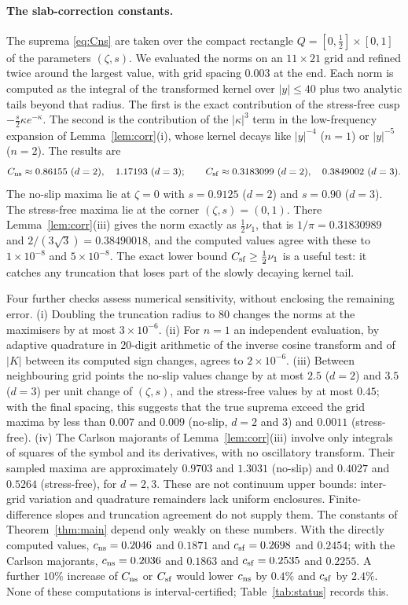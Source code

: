 \paragraph{The slab-correction constants.} The suprema \eqref{eq:Cns} are taken over the compact rectangle
$Q=[0,\frac12]\times[0,1]$ of the parameters $(\zeta,s)$. We evaluated the norms on an $11\times21$ grid and
refined twice around the largest value, with grid spacing $0.003$ at the end. Each norm is computed as the
integral of the transformed kernel over $|y|\le40$ plus two analytic tails beyond that radius. The first is the
exact contribution of the stress-free cusp $-\frac s2\kappa e^{-\kappa}$. The second is the contribution of the
$|\kappa|^3$ term in the low-frequency expansion of Lemma~\ref{lem:corr}(i), whose kernel decays like
$|y|^{-4}$ ($n=1$) or $|y|^{-5}$ ($n=2$). The results are
\[
C_{\rm ns}\approx0.86155\ (d=2),\quad 1.17193\ (d=3);\qquad C_{\rm sf}\approx0.3183099\ (d=2),\quad 0.3849002\ (d=3).
\]
The no-slip maxima lie at $\zeta=0$ with $s=0.9125$ ($d=2$) and $s=0.90$ ($d=3$). The stress-free maxima lie at
the corner $(\zeta,s)=(0,1)$. There Lemma~\ref{lem:corr}(iii) gives the norm exactly as $\frac12\nu_1$, that is
$1/\pi=0.31830989$ and $2/(3\sqrt3)=0.38490018$, and the computed values agree with these to $1\times10^{-8}$
and $5\times10^{-8}$. The exact lower bound $C_{\rm sf}\ge\frac12\nu_1$ is a useful test: it catches any
truncation that loses part of the slowly decaying kernel tail.

Four further checks assess numerical sensitivity, without enclosing the remaining error. (i) Doubling the truncation radius to $80$ changes the norms at
the maximisers by at most $3\times10^{-6}$. (ii) For $n=1$ an independent evaluation, by adaptive quadrature in
$20$-digit arithmetic of the inverse cosine transform and of $|K|$ between its computed sign changes, agrees to
$2\times10^{-6}$. (iii) Between neighbouring grid points the no-slip values change by at most $2.5$ ($d=2$) and $3.5$ ($d=3$)
per unit change of $(\zeta,s)$, and the stress-free values by at most $0.45$; with the final spacing, this suggests that the true suprema exceed the grid maxima
by less than $0.007$ and $0.009$ (no-slip, $d=2$ and $3$) and $0.0011$ (stress-free). (iv) The Carlson majorants of
Lemma~\ref{lem:corr}(iii) involve only integrals of squares of the symbol and its derivatives, with no
oscillatory transform. Their sampled maxima are approximately $0.9703$ and $1.3031$ (no-slip) and
$0.4027$ and $0.5264$ (stress-free), for $d=2,3$. These are not continuum upper bounds:
inter-grid variation and quadrature remainders lack uniform enclosures. Finite-difference slopes and
truncation agreement do not supply them. The constants of
Theorem~\ref{thm:main} depend only weakly on these numbers. With the directly computed values,
$c_{\rm ns}=0.2046$ and $0.1871$ and $c_{\rm sf}=0.2698$ and $0.2454$; with the Carlson majorants,
$c_{\rm ns}=0.2036$ and $0.1863$ and $c_{\rm sf}=0.2535$ and $0.2255$. A further $10\%$ increase of $C_{\rm ns}$
or $C_{\rm sf}$ would lower $c_{\rm ns}$ by $0.4\%$ and $c_{\rm sf}$ by $2.4\%$. None of these computations is
interval-certified; Table~\ref{tab:status} records this.

